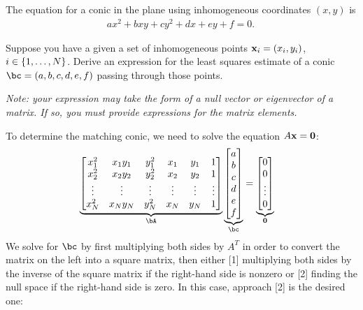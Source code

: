 \begin{problem}
  The equation for a conic in the plane using inhomogeneous
  coordinates $(x, y)$ is
  \begin{align}
    ax^2 + bxy + cy^2 + dx + ey + f = 0.~\label{eq:2.1}
  \end{align}

  \begin{enumalph}
    \item Suppose you have a given a set of inhomogeneous points
      $\mathbf{x}_i = (x_i, y_i)$, $i \in \left\{1, \ldots, N\right\}$.
      Derive an expression for the least squares estimate
      of a conic $\bc = (a, b, c, d, e, f)$ passing through those points.
      
      \step
      \emph{
        Note: your expression may take the form of a
        null vector or eigenvector of a matrix.
        If so, you must provide expressions
        for the matrix elements.
      }
      \begin{answer}
        To determine the matching conic, we need to solve the equation
        $A\mathbf{x} = \mathbf{0}$:
        \begin{align*}
          \underbrace{\begin{bmatrix}
            x_1^2 & x_1y_1 & y_1^2 & x_1 & y_1 & 1 \\
            x_2^2 & x_2y_2 & y_2^2 & x_2 & y_2 & 1 \\
            \vdots & \vdots & \vdots & \vdots & \vdots & \vdots \\
            x_N^2 & x_Ny_N & y_N^2 & x_N & y_N & 1 \\
          \end{bmatrix}}_{\bA}
          \underbrace{\begin{bmatrix}
            a \\
            b \\
            c \\
            d \\
            e \\
            f \\
          \end{bmatrix}}_{\bc}
          &=
          \underbrace{\begin{bmatrix}
            0 \\
            0 \\
            \vdots \\
            0 \\
          \end{bmatrix}}_{\mathbf{0}}
        \end{align*}
        We solve for $\bc$ by first multiplying both sides
        by $A^T$ in order to convert the matrix on the left into a square
        matrix, then either [1] multiplying both sides by the inverse
        of the square matrix if the right-hand side is nonzero
        or [2] finding the null space if the right-hand side is zero.
        In this case, approach [2] is the desired one:


\end{answer}
\end{enumalph}
\end{problem}
